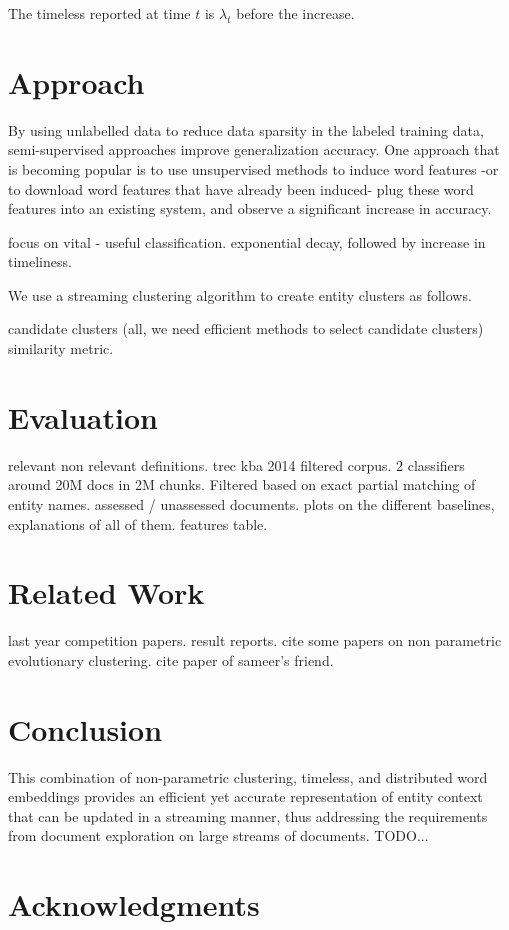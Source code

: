 \documentclass{article}
\begin{document}
The timeless reported at time $t$ is $\lambda_t$ before the increase.

\section{Approach}
\label{approach}


By using unlabelled data to reduce data sparsity in the labeled training data, semi-supervised approaches improve generalization accuracy.
One approach that is becoming popular is to use unsupervised methods to induce word features -or to download word features that have already been induced- plug these word features into an existing system, and observe a significant increase in accuracy.


focus on vital - useful classification.
exponential decay, followed by increase in timeliness.

We use a streaming clustering algorithm to create entity clusters as follows.

candidate clusters (all, we need efficient methods to select candidate clusters)
similarity metric.


\section{Evaluation}
\label{evaluation}

relevant non relevant definitions.
trec kba 2014 filtered corpus.
2 classifiers
around 20M docs in 2M chunks. Filtered based on exact partial matching of entity names.
assessed / unassessed documents.
plots on the different baselines, explanations of all of them.
features table.

\section{Related Work}
\label{related}

last year competition papers. result reports.
cite some papers on non parametric evolutionary clustering.
cite paper of sameer's friend.


\section{Conclusion}
\label{conclusion}

This combination of non-parametric clustering, timeless, and distributed word embeddings provides an efficient yet accurate representation of entity context that can be updated in a streaming manner, thus addressing the requirements from document exploration on large streams of documents.
TODO...

\section*{Acknowledgments} 
 


\end{document}
